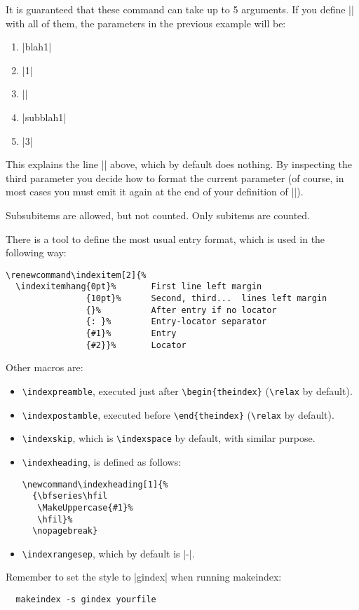 \documentclass[a4paper]{ltxguide}
\begin{document}
It is guaranteed that these command can take up to 5 arguments. If you
define |\indexitem| with all of them, the parameters in the previous
example will be:
\begin{enumerate}
  \item |blah1|
  \item |1|
  \item |\indexsubitem|
  \item |subblah1|
  \item |3|
\end{enumerate}
This explains the line |\indexnoitem{}{}| above, which by default does
nothing. By inspecting the third parameter you decide how to format the
current parameter (of course, in most cases you must emit it again at
the end of your definition of |\indexitem|).

Subsubitems are allowed, but not counted. Only subitems are counted.


There is a tool to define the most usual entry format, which is used in
the following way:
\begin{verbatim}
\renewcommand\indexitem[2]{%
  \indexitemhang{0pt}%       First line left margin
                {10pt}%      Second, third...  lines left margin
                {}%          After entry if no locator
                {: }%        Entry-locator separator
                {#1}%        Entry
                {#2}}%       Locator
\end{verbatim}

Other macros are:
\begin{itemize}
\item \verb|\indexpreamble|, executed just after
  \verb|\begin{theindex}| (\verb|\relax| by default).
\item \verb|\indexpostamble|, executed before 
  \verb|\end{theindex}| (\verb|\relax| by default).
\item \verb|\indexskip|, which is \verb|\indexspace| by default, 
with similar purpose.
\item \verb|\indexheading|, is defined as follows:
\begin{verbatim}
\newcommand\indexheading[1]{%
  {\bfseries\hfil
   \MakeUppercase{#1}%
   \hfil}%
  \nopagebreak}
\end{verbatim}
\item \verb|\indexrangesep|, which by default is |-|.
\end{itemize}

Remember to set the style to |gindex| when running \textsf{makeindex}:
\begin{verbatim}
  makeindex -s gindex yourfile
\end{verbatim}
\end{document}
